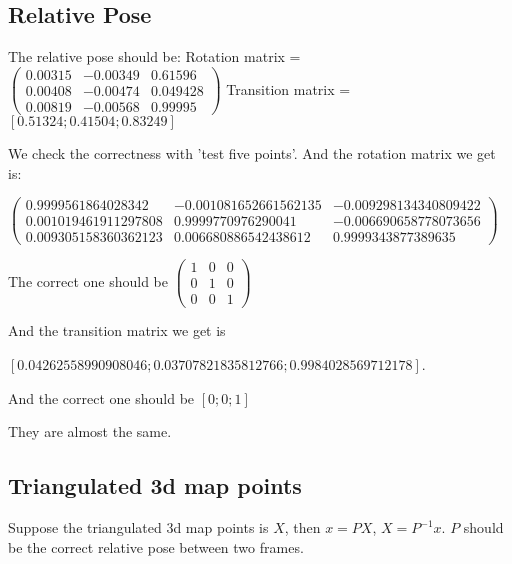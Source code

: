 \documentclass{article}
\begin{document}
\subsection{Relative Pose}
The relative pose should be:
Rotation matrix = $\begin{pmatrix}
0.00315& -0.00349& 0.61596\\
0.00408& -0.00474& 0.049428 \\
0.00819&-0.00568& 0.99995
\end{pmatrix}$ 
Transition matrix = $[0.51324; 0.41504; 0.83249]$

We check the correctness with 'test five points'. 
And the rotation matrix we get is:

$\begin{pmatrix}
0.9999561864028342& -0.001081652661562135& -0.009298134340809422\\
0.001019461911297808& 0.9999770976290041& -0.006690658778073656 \\
0.009305158360362123&0.006680886542438612& 0.9999343877389635
\end{pmatrix}$ 

The correct one should be $\begin{pmatrix}
1& 0& 0\\
0& 1& 0\\
0&0& 1
\end{pmatrix}$

And the transition matrix we get is 

$[0.04262558990908046;
0.03707821835812766;
0.9984028569712178]$. 

And the correct one should be $[0;0;1]$

They are almost the same.

\subsection{Triangulated 3d map points}
Suppose the triangulated 3d map points is $X$, then $x = PX$, $X = P^{-1}x$. $P$ should be the correct relative pose between two frames.




	
\end{document}
